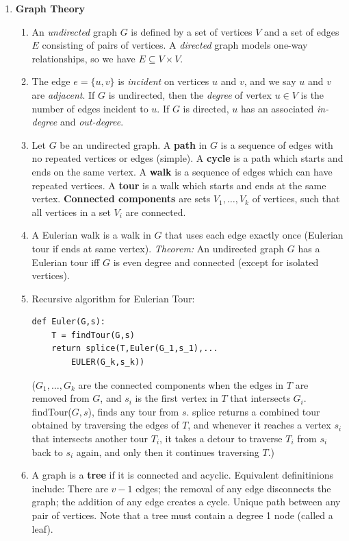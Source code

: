 \documentclass[10pt]{article}
\begin{document}
\begin{multicols}{2}
\begin{enumerate}
    \item \textbf{Graph Theory} 
    \begin{enumerate}
        \item An \textit{undirected} graph $G$ is defined by a set of vertices $V$ and a set of edges $E$ consisting of pairs of vertices. A \textit{directed} graph models one-way relationships, so we have $E \subseteq V \times V$.
        \item The edge $e = \{u, v \}$ is \textit{incident} on vertices $u$ and $v$, and we say $u$ and $v$ are \textit{adjacent}. If $G$ is undirected, then the \textit{degree} of vertex $u \in V$ is the number of edges incident to $u$. If $G$ is directed, $u$ has an associated \textit{in-degree} and \textit{out-degree}.
        \item Let $G$ be an undirected graph. A \textbf{path} in $G$ is a sequence of edges with no repeated vertices or edges (simple). A \textbf{cycle} is a path which starts and ends on the same vertex. A \textbf{walk} is a sequence of edges which can have repeated vertices. A \textbf{tour} is a walk which starts and ends at the same vertex. \textbf{Connected components} are sets $V_1,\hdots,V_k$ of vertices, such that all vertices in a set $V_i$ are connected.
        \item A Eulerian walk is a walk in $G$ that uses each edge exactly once (Eulerian tour if ends at same vertex). \textit{Theorem:} An undirected graph $G$ has a Eulerian tour iff $G$ is even degree and connected (except for isolated vertices). 
        \item Recursive algorithm for Eulerian Tour:
        \begin{verbatim}
def Euler(G,s): 
    T = findTour(G,s) 
    return splice(T,Euler(G_1,s_1),...
        EULER(G_k,s_k))
        \end{verbatim}
        ($G_1, \hdots,G_k$ are the connected components when the edges in $T$ are removed from $G$, and $s_i$ is the first vertex in $T$ that intersects $G_i$. findTour($G,s$), finds any tour from $s$. splice returns a combined tour obtained by traversing the edges of $T$, and whenever it reaches a vertex $s_i$ that intersects another tour $T_i$, it takes a detour to traverse $T_i$ from $s_i$ back to $s_i$ again, and only then it continues traversing $T$.)
        \item A graph is a \textbf{tree} if it is connected and acyclic. Equivalent definitinions include: There are $v-1$ edges; the removal of any edge disconnects the graph; the addition of any edge creates a cycle. Unique path between any pair of vertices. Note that a tree must contain a degree 1 node (called a leaf).

\end{enumerate}
\end{enumerate}
\end{multicols}
\end{document}
